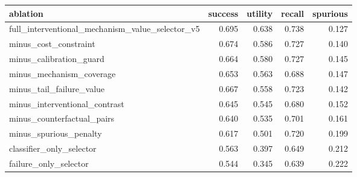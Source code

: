 \begin{tabular}{lrrrr}
\toprule
ablation & success & utility & recall & spurious \\
\midrule
full\_interventional\_mechanism\_value\_selector\_v5 & 0.695 & 0.638 & 0.738 & 0.127 \\
minus\_cost\_constraint & 0.674 & 0.586 & 0.727 & 0.140 \\
minus\_calibration\_guard & 0.664 & 0.580 & 0.727 & 0.145 \\
minus\_mechanism\_coverage & 0.653 & 0.563 & 0.688 & 0.147 \\
minus\_tail\_failure\_value & 0.667 & 0.558 & 0.723 & 0.142 \\
minus\_interventional\_contrast & 0.645 & 0.545 & 0.680 & 0.152 \\
minus\_counterfactual\_pairs & 0.640 & 0.535 & 0.701 & 0.161 \\
minus\_spurious\_penalty & 0.617 & 0.501 & 0.720 & 0.199 \\
classifier\_only\_selector & 0.563 & 0.397 & 0.649 & 0.212 \\
failure\_only\_selector & 0.544 & 0.345 & 0.639 & 0.222 \\
\bottomrule
\end{tabular}
